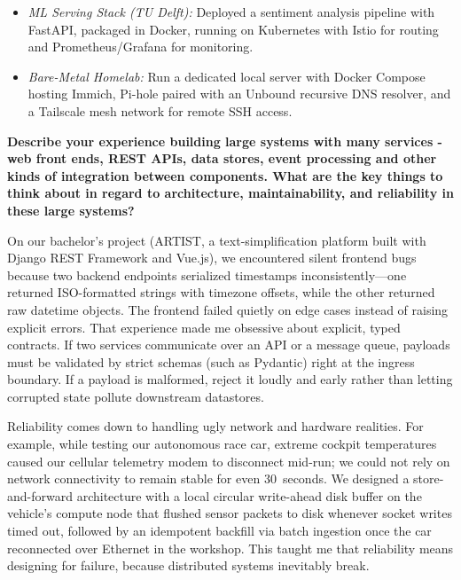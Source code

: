 \documentclass[letterpaper,11pt]{article}
\newcommand{\interviewQuestion}[1]{%
  \vspace{8pt}%
  \textbf{\color{airforceblue}#1}\par%
}
\begin{document}
\begin{itemize}[leftmargin=0.2in, itemsep=3pt]
\begin{itemize}[leftmargin=0.15in, itemsep=2pt]
              \item \textit{ML Serving Stack (TU Delft):} Deployed a sentiment analysis pipeline with FastAPI, packaged in Docker, running on Kubernetes with Istio for routing and Prometheus/Grafana for monitoring.
              \item \textit{Bare-Metal Homelab:} Run a dedicated local server with Docker Compose hosting Immich, Pi-hole paired with an Unbound recursive DNS resolver, and a Tailscale mesh network for remote SSH access.
          \end{itemize}
\end{itemize}

\interviewQuestion{Describe your experience building large systems with many services - web front ends, REST APIs, data stores, event processing and other kinds of integration between components. What are the key things to think about in regard to architecture, maintainability, and reliability in these large systems?}


On our bachelor's project (ARTIST, a text-simplification platform built with Django REST Framework and Vue.js), we encountered silent frontend bugs because two backend endpoints serialized timestamps inconsistently—one returned ISO-formatted strings with timezone offsets, while the other returned raw datetime objects. The frontend failed quietly on edge cases instead of raising explicit errors. That experience made me obsessive about explicit, typed contracts. If two services communicate over an API or a message queue, payloads must be validated by strict schemas (such as Pydantic) right at the ingress boundary. If a payload is malformed, reject it loudly and early rather than letting corrupted state pollute downstream datastores.

Reliability comes down to handling ugly network and hardware realities. For example, while testing our autonomous race car, extreme cockpit temperatures caused our cellular telemetry modem to disconnect mid-run; we could not rely on network connectivity to remain stable for even 30~seconds. We designed a store-and-forward architecture with a local circular write-ahead disk buffer on the vehicle's compute node that flushed sensor packets to disk whenever socket writes timed out, followed by an idempotent backfill via batch ingestion once the car reconnected over Ethernet in the workshop. This taught me that reliability means designing for failure, because distributed systems inevitably break.
\end{document}
